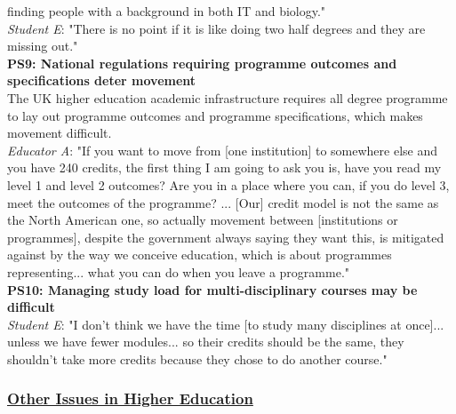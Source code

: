 finding people with a background in both IT and biology."\\
\textit{Student E}: "There is no point if it is like doing two half degrees and they are missing out."
\vspace{0.25cm}\\
\textbf{PS9: National regulations requiring programme outcomes and specifications deter movement}\\
The UK higher education academic infrastructure requires all degree programme to lay out 
programme outcomes and programme specifications, which makes movement difficult.\\
\textit{Educator A}: "If you want to move from [one institution] to somewhere else and you have 240 credits, 
the first thing I am going to ask you is, have you read my level 1 and level 2 outcomes? Are you 
in a place where you can, if you do level 3, meet the outcomes of the programme? ... 
[Our] credit model is not the same as the North American one, so actually movement 
between [institutions or programmes], despite the government always saying they want this, 
is mitigated against by the way we conceive education, which is about programmes representing... 
what you can do when you leave a programme."
\vspace{0.25cm}\\
\textbf{PS10: Managing study load for multi-disciplinary courses may be difficult}\\
\textit{Student E}: "I don't think we have the time [to study many disciplines at once]... unless 
we have fewer modules... so their credits should be the same, they shouldn't take more credits 
because they chose to do another course."

\subsubsection{\underline{Other Issues in Higher Education}}

